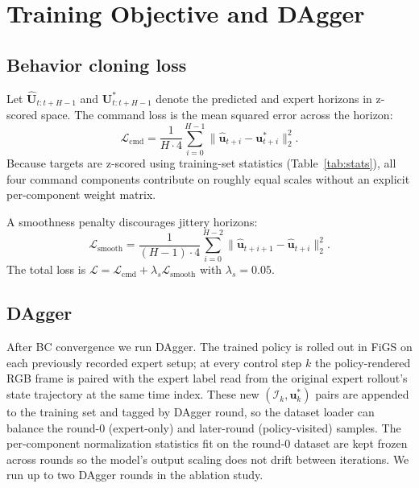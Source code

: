 \documentclass[10pt,twocolumn,letterpaper]{article}
\begin{document}
\section{Training Objective and DAgger}
\label{sec:training}

\subsection{Behavior cloning loss}

Let $\hat{\mathbf{U}}_{t:t+H-1}$ and $\mathbf{U}^{*}_{t:t+H-1}$ denote the predicted and expert horizons in z-scored space. The command loss is the mean squared error across the horizon:
\begin{equation}
\label{eq:mse}
\mathcal{L}_{\mathrm{cmd}} = \frac{1}{H \cdot 4} \sum_{i=0}^{H-1} \|\hat{\mathbf{u}}_{t+i} - \mathbf{u}^{*}_{t+i}\|_2^2.
\end{equation}
Because targets are z-scored using training-set statistics (Table~\ref{tab:stats}), all four command components contribute on roughly equal scales without an explicit per-component weight matrix.

A smoothness penalty discourages jittery horizons:
\begin{equation}
\label{eq:smooth}
\mathcal{L}_{\mathrm{smooth}} = \frac{1}{(H{-}1) \cdot 4} \sum_{i=0}^{H-2} \|\hat{\mathbf{u}}_{t+i+1} - \hat{\mathbf{u}}_{t+i}\|_2^2.
\end{equation}
The total loss is $\mathcal{L} = \mathcal{L}_{\mathrm{cmd}} + \lambda_s \mathcal{L}_{\mathrm{smooth}}$ with $\lambda_s = 0.05$.

\subsection{DAgger}

After BC convergence we run DAgger. The trained policy is rolled out in FiGS on each previously recorded expert setup; at every control step $k$ the policy-rendered RGB frame is paired with the expert label read from the original expert rollout's state trajectory at the same time index. These new $(\mathcal{I}_k, \mathbf{u}^{*}_k)$ pairs are appended to the training set and tagged by DAgger round, so the dataset loader can balance the round-0 (expert-only) and later-round (policy-visited) samples. The per-component normalization statistics fit on the round-0 dataset are kept frozen across rounds so the model's output scaling does not drift between iterations. We run up to two DAgger rounds in the ablation study.
\end{document}
